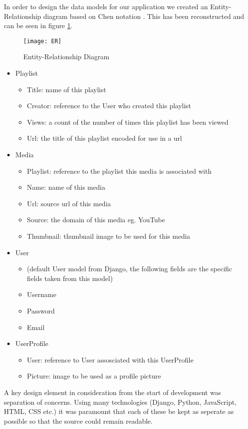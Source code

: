 In order to design the data models for our application we created an
Entity-Relationship diagram based on Chen notation
\cite{ChenNotation}.
This has been reconstructed and can be seen in figure \ref{fig:ER}.

\begin{figure}[h]
  \begin{center}
    \texttt{[image: ER]}
    \caption{Entity-Relationship Diagram} \label{fig:ER}
  \end{center}
\end{figure}

\begin{itemize}
\item{Playlist}
  \begin{itemize}
  \item{Title: name of this playlist}
  \item{Creator: reference to the User who created this playlist}
  \item{Views: a count of the number of times this playlist has
      been viewed}
  \item{Url: the title of this playlist encoded for use in a url}
  \end{itemize}
\item{Media}
  \begin{itemize}
  \item{Playlist: reference to the playlist this media is associated
      with}
  \item{Name: name of this media}
  \item{Url: source url of this media}
  \item{Source: the domain of this media eg. YouTube}
  \item{Thumbnail: thumbnail image to be used for this media}
  \end{itemize}
\item{User}
  \begin{itemize}
  \item{(default User model from Django, the following fields are the
      specific fields taken from this model)}
  \item{Username}
  \item{Password}
  \item{Email}
  \end{itemize}
\item{UserProfile}
  \begin{itemize}
  \item{User: reference to User assosciated with this UserProfile}
  \item{Picture: image to be used as a profile picture}
  \end{itemize}
\end{itemize}

A key design element in consideration from the start of development
was separation of concerns.
Using many technologies (Django, Python, JavaScript, HTML, CSS etc.)
it was paramount that each of these be kept as seperate as possible so
that the source could remain readable.